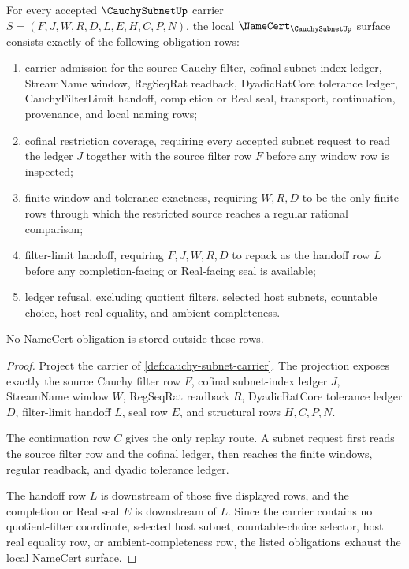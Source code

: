 \begin{theorem}
\label{thm:cauchy-subnet-namecert-obligations}
For every accepted $\CauchySubnetUp$ carrier $S=(F,J,W,R,D,L,E,H,C,P,N)$, the local $\NameCert_{\CauchySubnetUp}$ surface consists exactly of the following obligation rows:
\begin{enumerate}
\item carrier admission for the source Cauchy filter, cofinal subnet-index ledger, StreamName window, RegSeqRat readback, DyadicRatCore tolerance ledger, CauchyFilterLimit handoff, completion or Real seal, transport, continuation, provenance, and local naming rows;
\item cofinal restriction coverage, requiring every accepted subnet request to read the ledger $J$ together with the source filter row $F$ before any window row is inspected;
\item finite-window and tolerance exactness, requiring $W,R,D$ to be the only finite rows through which the restricted source reaches a regular rational comparison;
\item filter-limit handoff, requiring $F,J,W,R,D$ to repack as the handoff row $L$ before any completion-facing or Real-facing seal is available;
\item ledger refusal, excluding quotient filters, selected host subnets, countable choice, host real equality, and ambient completeness.
\end{enumerate}
No NameCert obligation is stored outside these rows.
\end{theorem}
\begin{proof}
Project the carrier of \autoref{def:cauchy-subnet-carrier}. The projection exposes exactly the source Cauchy filter row $F$, cofinal subnet-index ledger $J$, StreamName window $W$, RegSeqRat readback $R$, DyadicRatCore tolerance ledger $D$, filter-limit handoff $L$, seal row $E$, and structural rows $H,C,P,N$.

The continuation row $C$ gives the only replay route. A subnet request first reads the source filter row and the cofinal ledger, then reaches the finite windows, regular readback, and dyadic tolerance ledger.

The handoff row $L$ is downstream of those five displayed rows, and the completion or Real seal $E$ is downstream of $L$. Since the carrier contains no quotient-filter coordinate, selected host subnet, countable-choice selector, host real equality row, or ambient-completeness row, the listed obligations exhaust the local NameCert surface.
\end{proof}

